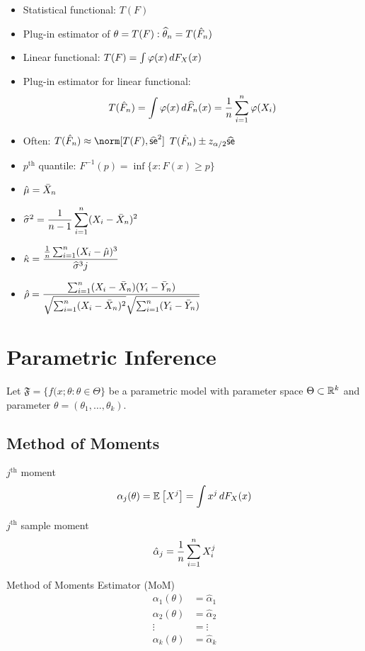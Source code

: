 \documentclass[landscape]{article}
\begin{document}
\begin{multicols*}{2}
\begin{itemize}
  \item Statistical functional: $T(F)$
  \item Plug-in estimator of $\theta = T(F): \widehat{\theta}_n = T(\hat{F}_n)$
  \item Linear functional: $T(F) = \int \varphi(x)\,dF_X(x)$
  \item Plug-in estimator for linear functional: \\
    $$T(\hat{F}_n) 
      = \displaystyle\int \varphi(x)\,d\widehat{F}_n(x) 
      = \frac{1}{n}\sum_{i=1}^n \varphi(X_i)$$
  \item Often: $T(\hat{F}_n) \approx \norm[T(F),\sehat^2]$ \imp
    $T(\hat{F}_n) \pm z_{\alpha/2}\widehat{\textsf{se}}$
  \item $p^\mathrm{th}$ quantile: $F^{-1}(p) = \inf\{x:F(x) \ge p\}$
  \item $\hat{\mu} = \bar{X}_n$ 
  \item $\widehat{\sigma}^2 = \displaystyle\frac{1}{n-1}\sum_{i=1}^n 
    (X_i-\bar{X}_n)^2$
  \item  $\hat{\kappa} =
    \displaystyle\frac{\frac{1}{n}\sum_{i=1}^n(X_i-\hat{\mu})^3}{\widehat{\sigma}^3j}$
  \item $\hat{\rho} =
    \displaystyle\frac{\sumin(X_i-\samplemean)(Y_i-\bar{Y}_n)}%
    {\sqrt{\sumin(X_i-\samplemean)^2}\sqrt{\sumin(Y_i-\bar{Y}_n)}}$
\end{itemize}

\section{Parametric Inference}

Let $\mathfrak{F} = \bigl\{ f(x;\theta : \theta \in \Theta \bigr\}$ be a
parametric model with parameter space $\Theta \subset \mathbb{R}^k$ and parameter 
$\theta = (\theta_1,\dots,\theta_k)$.

\subsection{Method of Moments}

$j^{\mathrm{th}}$ moment
$$\alpha_j(\theta) = \mathbb{E}_{}\left[X^j\right] = \displaystyle\int x^j \,dF_X(x)$$

$j^{\mathrm{th}}$ sample moment
$$\hat{\alpha}_j = \displaystyle\frac{1}{n}\sum_{i=1}^n X_i^j$$

Method of Moments Estimator (MoM)
\begin{align*}
  \alpha_1(\theta) &= \hat{\alpha}_1 \\
  \alpha_2(\theta) &= \hat{\alpha}_2 \\
  \vdots &= \vdots \\
  \alpha_k(\theta) &= \hat{\alpha}_k
\end{align*}


\end{multicols*}
\end{document}
